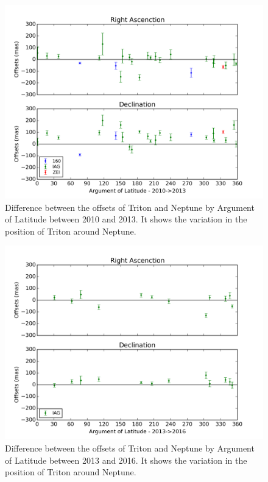 \documentclass[12pt,a4paper]{report}
\begin{document}
\begin{figure}[H]
\includegraphics[width=16.0cm]{Anom_TN_2010-2013.png} 
\caption{Difference between the offsets of Triton and Neptune by Argument of Latitude between 2010 and 2013. It shows the variation in the position of Triton around Neptune.}
\label{Fig:triton-netuno-anom}
\end{figure}

\begin{figure}[H]
\includegraphics[width=16.0cm]{Anom_TN_2013-2016.png} 
\caption{Difference between the offsets of Triton and Neptune by Argument of Latitude between 2013 and 2016. It shows the variation in the position of Triton around Neptune.}
\label{Fig:triton-netuno-anom}
\end{figure}



\end{document}
